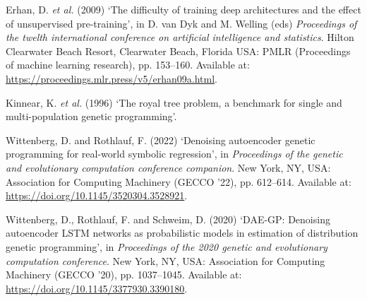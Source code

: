 \documentclass[
  12pt,
]{article}
\newlength{\cslhangindent}
\newlength{\cslentryspacingunit} %
\newenvironment{CSLReferences}[2] %
 {%
  \setlength{\parindent}{0pt}
  \ifodd #1
  \let\oldpar\par
  \def\par{\hangindent=\cslhangindent\oldpar}
  \fi
  \setlength{\parskip}{#2\cslentryspacingunit}
 }%
 {}
\begin{document}
\hypertarget{refs}{}
\begin{CSLReferences}{0}{0}
\leavevmode{}%
Erhan, D. \emph{et al.} (2009) {`The difficulty of training deep
architectures and the effect of unsupervised pre-training'}, in D. van
Dyk and M. Welling (eds) \emph{Proceedings of the twelth international
conference on artificial intelligence and statistics}. Hilton Clearwater
Beach Resort, Clearwater Beach, Florida USA: PMLR (Proceedings of
machine learning research), pp. 153--160. Available at:
\url{https://proceedings.mlr.press/v5/erhan09a.html}.

\leavevmode{}%
Kinnear, K. \emph{et al.} (1996) {`The royal tree problem, a benchmark
for single and multi-population genetic programming'}.

\leavevmode{}%
Wittenberg, D. and Rothlauf, F. (2022) {`Denoising autoencoder genetic
programming for real-world symbolic regression'}, in \emph{Proceedings
of the genetic and evolutionary computation conference companion}. New
York, NY, USA: Association for Computing Machinery (GECCO '22), pp.
612--614. Available at: \url{https://doi.org/10.1145/3520304.3528921}.

\leavevmode{}%
Wittenberg, D., Rothlauf, F. and Schweim, D. (2020) {`DAE-GP: Denoising
autoencoder LSTM networks as probabilistic models in estimation of
distribution genetic programming'}, in \emph{Proceedings of the 2020
genetic and evolutionary computation conference}. New York, NY, USA:
Association for Computing Machinery (GECCO '20), pp. 1037--1045.
Available at: \url{https://doi.org/10.1145/3377930.3390180}.

\end{CSLReferences}
\end{document}
